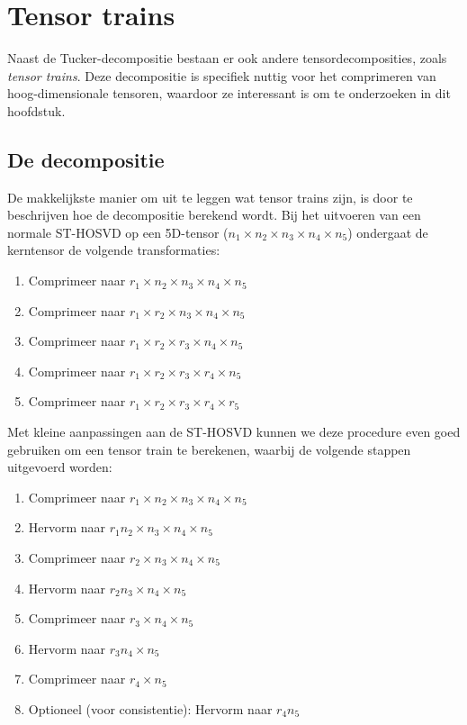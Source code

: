 \section{Tensor trains}

Naast de Tucker-decompositie bestaan er ook andere tensordecomposities, zoals \textit{tensor trains}. Deze decompositie is specifiek nuttig voor het comprimeren van hoog-dimensionale tensoren, waardoor ze interessant is om te onderzoeken in dit hoofdstuk.

\subsection{De decompositie}

De makkelijkste manier om uit te leggen wat tensor trains zijn, is door te beschrijven hoe de decompositie berekend wordt. Bij het uitvoeren van een normale ST-HOSVD op een 5D-tensor ($n_1 \times n_2 \times n_3 \times n_4 \times n_5$) ondergaat de kerntensor de volgende transformaties:

\begin{enumerate}
\item Comprimeer naar $r_1 \times n_2 \times n_3 \times n_4 \times n_5$
\item Comprimeer naar $r_1 \times r_2 \times n_3 \times n_4 \times n_5$
\item Comprimeer naar $r_1 \times r_2 \times r_3 \times n_4 \times n_5$
\item Comprimeer naar $r_1 \times r_2 \times r_3 \times r_4 \times n_5$
\item Comprimeer naar $r_1 \times r_2 \times r_3 \times r_4 \times r_5$
\end{enumerate}

Met kleine aanpassingen aan de ST-HOSVD kunnen we deze procedure even goed gebruiken om een tensor train te berekenen, waarbij de volgende stappen uitgevoerd worden:

\begin{enumerate}
\item Comprimeer naar $r_1 \times n_2 \times n_3 \times n_4 \times n_5$
\item Hervorm naar $r_1 n_2 \times n_3 \times n_4 \times n_5$
\item Comprimeer naar $r_2 \times n_3 \times n_4 \times n_5$
\item Hervorm naar $r_2 n_3 \times n_4 \times n_5$
\item Comprimeer naar $r_3 \times n_4 \times n_5$
\item Hervorm naar $r_3 n_4 \times n_5$
\item Comprimeer naar $r_4 \times n_5$
\item Optioneel (voor consistentie): Hervorm naar $r_4 n_5$
\end{enumerate}

